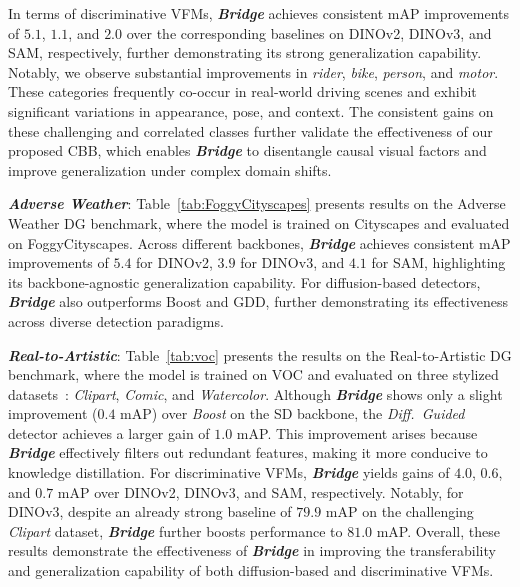 In terms of discriminative VFMs, \textbf{\textit{Bridge}} achieves consistent mAP improvements of $\mathbf{5.1}$, $\mathbf{1.1}$, and $\mathbf{2.0}$ over the corresponding baselines on DINOv2, DINOv3, and SAM, respectively, further demonstrating its strong generalization capability.  
Notably, we observe substantial improvements in \textit{rider}, \textit{bike}, \textit{person}, and \textit{motor}.  
These categories frequently {co-occur} in real-world driving scenes and exhibit significant {variations} in appearance, pose, and context.  
The consistent gains on these challenging and correlated classes further validate the effectiveness of our proposed CBB, which enables \textbf{\textit{Bridge}} to disentangle causal visual factors and improve generalization under complex domain shifts.


\noindent\textbf{\textit{Adverse Weather}}:
Table~\ref{tab:FoggyCityscapes} presents results on the Adverse Weather DG benchmark, where the model is trained on Cityscapes and evaluated on FoggyCityscapes. Across different backbones, \textbf{\textit{Bridge}} achieves consistent mAP improvements of $\mathbf{5.4}$ for DINOv2, $\mathbf{3.9}$ for DINOv3, and $\mathbf{4.1}$ for SAM, highlighting its backbone-agnostic generalization capability. For diffusion-based detectors, \textbf{\textit{Bridge}} also outperforms Boost and GDD, further demonstrating its effectiveness across diverse detection paradigms.


\noindent\textbf{\textit{Real-to-Artistic}}:
Table~\ref{tab:voc} presents the results on the Real-to-Artistic DG benchmark, where the model is trained on VOC and evaluated on three stylized datasets~\cite{inoue2018cross}: \textit{Clipart}, \textit{Comic}, and \textit{Watercolor}.
Although \textbf{\textit{Bridge}} shows only a slight improvement ($\mathbf{0.4}$ mAP) over \textit{Boost} on the SD backbone, the \textit{Diff.~Guided} detector achieves a larger gain of $\mathbf{1.0}$ mAP. This improvement arises because \textbf{\textit{Bridge}} effectively filters out redundant features, making it more conducive to knowledge distillation.
For discriminative VFMs, \textbf{\textit{Bridge}} yields gains of $\mathbf{4.0}$, $\mathbf{0.6}$, and $\mathbf{0.7}$ mAP over DINOv2, DINOv3, and SAM, respectively. Notably, for DINOv3, despite an already strong baseline of $\mathbf{79.9}$ mAP on the challenging \textit{Clipart} dataset, \textbf{\textit{Bridge}} further boosts performance to $\mathbf{81.0}$ mAP.
Overall, these results demonstrate the effectiveness of \textbf{\textit{Bridge}} in improving the transferability and generalization capability of both diffusion-based and discriminative VFMs.



